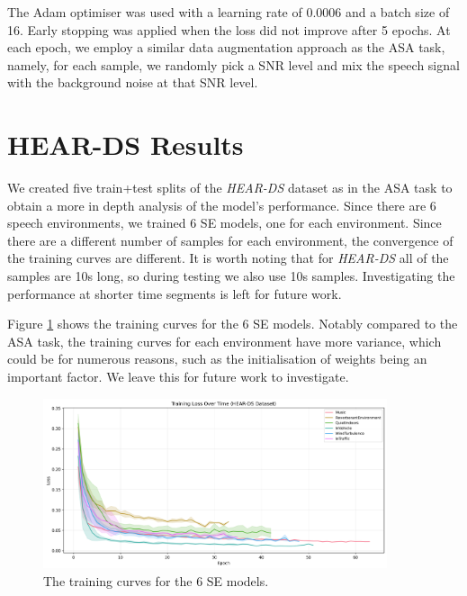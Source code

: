 \documentclass[logo,bsc,singlespacing,parskip,online]{infthesis}
\newcommand{\heards}{\textit{HEAR-DS}\xspace}
\begin{document}
The Adam optimiser was used with a learning rate of 0.0006 and a batch size of 16.
Early stopping was applied when the loss did not improve after 5 epochs.
At each epoch, we employ a similar data augmentation approach as the ASA task, 
namely, for each sample, we randomly pick a SNR level and mix the speech signal with the background noise 
at that SNR level. 


% 

\section{HEAR-DS Results}
We created five train+test splits of the \heards dataset as in the ASA task to obtain a 
more in depth analysis of the model's performance. Since there 
are 6 speech environments, we trained 6 SE models, one for each environment. 
Since there are a different number of samples for each environment, 
the convergence of the training curves are different. 
It is worth noting that for \heards all of the samples are 10s long,
so during testing we also use 10s samples. Investigating 
the performance at shorter time segments is left for future work.

Figure \ref{fig:hear-ds-training-curves} shows the training curves for the 
6 SE models. Notably compared to the ASA task, the training curves for each 
environment have more variance, which could be for numerous reasons, such 
as the initialisation of weights being an important factor. We leave this 
for future work to investigate.

\begin{figure}[h]
   \centering
   \includegraphics[width=0.9\textwidth]{se-hear-ds_training_losses.png}
   \caption{The training curves for the 6 SE models.}
   \label{fig:hear-ds-training-curves}
\end{figure}
\end{document}

